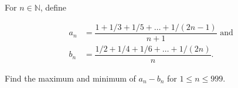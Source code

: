 For $n \in \mathbb{N}$, define

$$
\begin{aligned}
a_n &= \dfrac{1 + 1/3 + 1/5 + \dots + 1/(2n - 1)}{n+1} \text{ and } \\
b_n &= \dfrac{1/2 + 1/4 + 1/6 + \dots + 1/(2n)}{n}.
\end{aligned}
$$

Find the maximum and minimum of $a_n - b_n$ for $1 \le n \le 999$.
